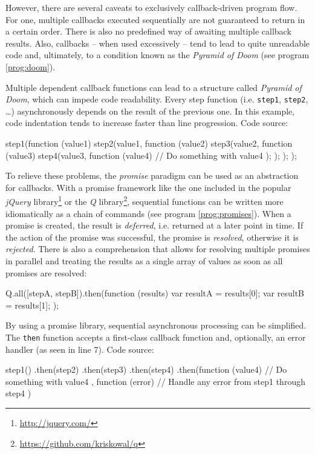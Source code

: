 However, there are several caveats to exclusively callback-driven program flow. For one, multiple callbacks executed sequentially are not guaranteed to return in a certain order. There is also no predefined way of awaiting multiple callback results. Also, callbacks -- when used excessively -- tend to lead to quite unreadable code and, ultimately, to a condition known as the \textit{Pyramid of Doom} (see program \ref{prog:doom}).
\begin{program}
  \caption{Multiple dependent callback functions can lead to a structure called \textit{Pyramid of Doom}, which can impede code readability. Every step function (i.e. \texttt{step1}, \texttt{step2}, \ldots) asynchronously depends on the result of the previous one. In this example, code indentation tends to increase faster than line progression. Code source: \cite[p. 21]{Torstensson2012}}
  \label{prog:doom}
  \begin{JavaCode}
step1(function (value1) {
    step2(value1, function (value2) {
        step3(value2, function (value3) {
            step4(value3, function (value4) {
                // Do something with value4
            });
        });
    });
});	
  \end{JavaCode}
\end{program}
To relieve these problems, the \textit{promise} paradigm can be used as an abstraction for callbacks. With a promise framework like the one included in the popular \textit{jQuery} library\footnote{\url{http://jquery.com/}} or the \textit{Q} library\footnote{\url{https://github.com/kriskowal/q}}, sequential functions can be written more idiomatically as a chain of commands (see program \ref{prog:promises}). When a promise is created, the result is \textit{deferred}, i.e. returned at a later point in time. If the action of the promise was successful, the promise is \textit{resolved}, otherwise it is \textit{rejected}. There is also a comprehension that allows for resolving multiple promises in parallel and treating the results as a single array of values as soon as all promises are resolved:

\begin{JavaCode}
Q.all([stepA, stepB]).then(function (results) {
    var resultA = results[0];
    var resultB = results[1];
});
\end{JavaCode}

\begin{program}
  \caption{By using a promise library, sequential asynchronous processing can be simplified. The \texttt{then} function accepts a first-class callback function and, optionally, an error handler (as seen in line 7). Code source: \cite[p. 21]{Torstensson2012}}
  \label{prog:promises}
  \begin{JavaCode}
step1()
.then(step2)
.then(step3)
.then(step4)
.then(function (value4) {
    // Do something with value4
}, function (error) {
    // Handle any error from step1 through step4
})
  \end{JavaCode}
\end{program}

